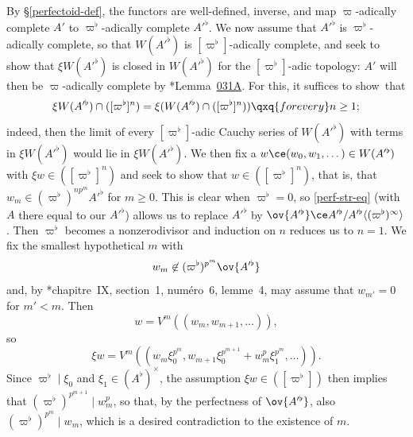 \bpf
By \S\ref{perfectoid-def}, the functors are well-defined, inverse, and %
map $\varpi$-adically complete $A'$ to $\varpi^\flat$-adically complete $A'^\flat$. We now assume that $A'^\flat$ is $\varpi^\flat$-adically complete, so that $W(A'^\flat)$ is $[\varpi^\flat]$-adically complete, and seek to show that $\xi W(A'^\flat)$  is closed in $W(A'^\flat)$ for the $[\varpi^\flat]$-adic topology: $A'$ will then be $\varpi$-adically complete by \cite{SP}*{Lemma~\href{https://stacks.math.columbia.edu/tag/031A}{031A}}. For this, it suffices to show~that
\[
\xi W(A'^\flat) \cap ([\varpi^\flat]^n) = \xi(W(A'^\flat) \cap ([\varpi^\flat]^{n})) \qxq{for every} n \ge 1;
\]
indeed, then the limit of every $[\varpi^\flat]$-adic Cauchy series of $W(A'^\flat)$ with terms in $\xi W(A'^\flat)$ would lie in $\xi W(A'^\flat)$. We then fix a $w \ce (w_0, w_1, \dotsc ) \in W(A'^\flat)$ with $\xi w \in ([\varpi^\flat]^n)$ and seek to show that $w \in ([\varpi^\flat]^n)$, that is, that $w_m \in (\varpi^\flat)^{np^m} A'^\flat$ for $m \ge 0$. This is clear when $\varpi^\flat = 0$, %
so \eqref{perf-str-eq} (with $A$ there equal to our $A'^\flat$) allows us to replace $A'^\flat$ by $\ov{A'^\flat} \ce A'^\flat/A'^\flat\langle(\varpi^\flat)^\infty\rangle$. %
Then $\varpi^\flat$ becomes a nonzerodivisor and induction on $n$ reduces us to $n = 1$. We fix the smallest hypothetical $m$ with
\[
w_m \not \in (\varpi^\flat)^{p^m} \ov{A'^\flat}
\]
and, by \cite{BouAC}*{chapitre~IX, section~1, num\'{e}ro~6, lemme~4}, may assume that $w_{m'} = 0$ for $m' < m$. Then
\[
w = V^m((w_m, w_{m + 1}, \dotsc)),
\]
so
\[
\xi w = V^m((w_m\xi_0^{p^m}, w_{m + 1}\xi_0^{p^{m + 1}} + w_m^p \xi_1^{p^m}, \dotsc)).
\]
Since $\varpi^\flat \mid \xi_0$ and $\xi_1 \in (A^\flat)^\times$, the assumption $\xi w \in ([\varpi^\flat])$ then implies that $(\varpi^\flat)^{p^{m + 1}} \mid w_m^p$, so that, by the perfectness of $\ov{A'^\flat}$, also $(\varpi^\flat)^{p^{m}} \mid w_m$, which is a desired contradiction to the existence of $m$.



